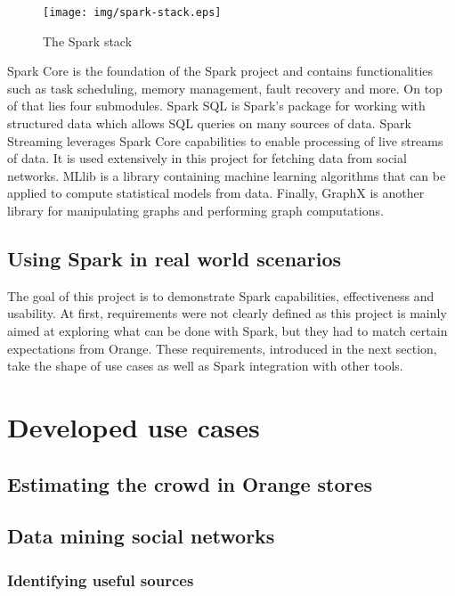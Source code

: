 \documentclass[11pt]{article}
\begin{document}
\begin{figure}[h!]
    \centering
    \texttt{[image: img/spark-stack.eps]}
    \caption{The Spark stack}
    \label{spark-stack}
\end{figure}

Spark Core is the foundation of the Spark project and contains functionalities such as task scheduling, memory management, fault recovery and more. On top of that lies four submodules.
Spark SQL is Spark's package for working with structured data which allows SQL queries on many sources of data.
Spark Streaming leverages Spark Core capabilities to enable processing of live streams of data. It is used extensively in this project for fetching data from social networks.
MLlib is a library containing machine learning algorithms that can be applied to compute statistical models from data.
Finally, GraphX is another library for manipulating graphs and performing graph computations.

\subsection{Using Spark in real world scenarios}
The goal of this project is to demonstrate Spark capabilities, effectiveness and usability. At first, requirements were not clearly defined as this project is mainly aimed at exploring what can be done with Spark, but they had to match certain expectations from Orange. These requirements, introduced in the next section, take the shape of use cases as well as Spark integration with other tools.

\section{Developed use cases}
\subsection{Estimating the crowd in Orange stores}

\subsection{Data mining social networks}

\subsubsection{Identifying useful sources}
\end{document}
